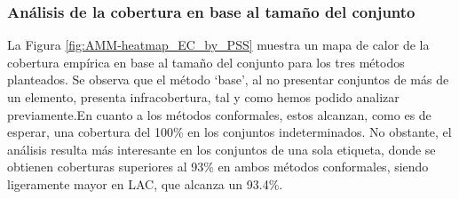 


\subsubsection{Análisis de la cobertura en base al tamaño del conjunto}

La Figura \ref{fig:AMM-heatmap_EC_by_PSS} muestra un mapa de calor de la cobertura empírica en base al tamaño del conjunto para los tres métodos planteados. Se observa que el método `base', al no presentar conjuntos de más de un elemento, presenta infracobertura, tal y como hemos podido analizar previamente.En cuanto a los métodos conformales, estos alcanzan, como es de esperar, una cobertura del 100\% en los conjuntos indeterminados. No obstante, el análisis resulta más interesante en los conjuntos de una sola etiqueta, donde se obtienen coberturas superiores al 93\% en ambos métodos conformales, siendo ligeramente mayor en LAC, que alcanza un 93.4\%. 

